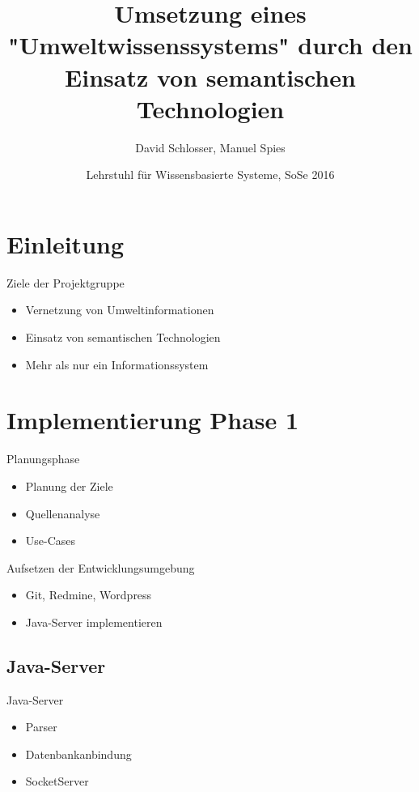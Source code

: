\documentclass[aspectratio=169]{beamer}
\title[Umwelt PG]{%
  Umsetzung eines "Umweltwissenssystems" durch den Einsatz von semantischen Technologien}
\subtitle{}
\author[David Schlosser, Manuel Spies]{%
  David Schlosser, Manuel Spies}
\date[Lehrstuhl für Wissensbasierte Systeme, SoSe 2016]{Lehrstuhl für Wissensbasierte Systeme, SoSe 2016}
\begin{document}
\begin{frame}
  \maketitle
\end{frame}

\section{Einleitung}

\begin{frame}{Ziele der Projektgruppe}
  \begin{itemize}
  	\item Vernetzung von Umweltinformationen
    \item Einsatz von semantischen Technologien
    \item Mehr als nur ein Informationssystem
  \end{itemize}
\end{frame}

\section{Implementierung Phase 1}

\begin{frame}{Planungsphase}
  \begin{itemize}
    \item Planung der Ziele
    \item Quellenanalyse
    \item Use-Cases
  \end{itemize}
\end{frame}

\begin{frame}{Aufsetzen der Entwicklungsumgebung}
  \begin{itemize}
  	\item Git, Redmine, Wordpress
  	\item Java-Server implementieren
  \end{itemize}
\end{frame}

\subsection{Java-Server}

\begin{frame}{Java-Server}
  \begin{itemize}
    \item Parser
    \item Datenbankanbindung
    \item SocketServer
  \end{itemize}
\end{frame}
\end{document}
